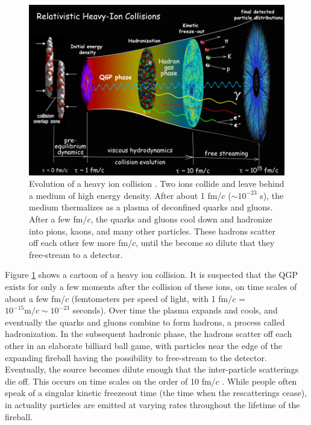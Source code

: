 \begin{figure}[hbt]
\includegraphics[width=36pc]{Figures/BorrowedFigures/HeavyIonEvolution.pdf}
\caption[Evolution of a heavy ion collision]{Evolution of a heavy ion collision \cite{Shen:2015msa}. 
Two ions collide and leave behind a medium of high energy density. 
After about 1 fm/$c$ ($\sim 10^{-23}$ s), the medium thermalizes as a plasma of deconfined quarks and gluons. 
After a few fm/$c$, the quarks and gluons cool down and hadronize into pions, kaons, and many other particles. These hadrons scatter off each other few more fm/$c$, until the become so dilute that they free-stream to a detector.}
\label{fig:HeavyIonEvolution}
\end{figure}

Figure \ref{fig:HeavyIonEvolution} shows a cartoon of a heavy ion collision.
It is suspected that the QGP exists for only a few moments after the collision of these ions, on time scales of about a few fm/$c$ (femtometers per speed of light, with 1 fm/$c$ = $10^{-15} \mathrm{m}/c \sim 10^{-23}$ seconds).
Over time the plasma expands and cools, and eventually the quarks and gluons combine to form hadrons, a process called hadronization.
In the subsequent hadronic phase, the hadrons scatter off each other in an elaborate billiard ball game, with particles near the edge of the expanding fireball having the possibility to free-stream to the detector.
Eventually, the source becomes dilute enough that the inter-particle scatterings die off. This occurs on time scales on the order of 10 fm/$c$ \cite{BraunMunzinger:2007zz}.
While people often speak of a singular kinetic freezeout time (the time when the rescatterings cease), in actuality particles are emitted at varying rates throughout the lifetime of the fireball.

